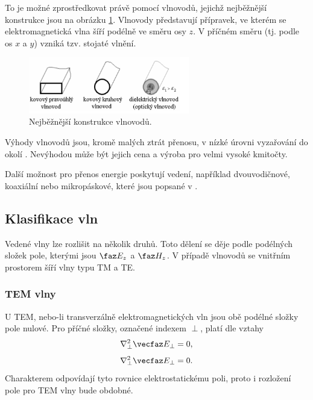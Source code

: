 To je možné zprostředkovat právě pomocí vlnovodů, jejichž nejběžnější konstrukce jsou na obrázku \ref{obr:evlny_vlnovody_konstrukce}. Vlnovody představují přípravek, ve kterém se elektromagnetická vlna šíří podélně ve směru osy $z$. V příčném směru (tj. podle os $x$ a $y$) vzniká tzv. stojaté vlnění.
\begin{figure}[!h]
	\centering
	\includegraphics[width=7cm]{evlny_vlnovody_konstrukce.png}
	\caption{Nejběžnější konstrukce vlnovodů.}
	\label{obr:evlny_vlnovody_konstrukce}
\end{figure}
Výhody vlnovodů jsou, kromě malých ztrát přenosu, v nízké úrovni vyzařování do okolí  . Nevýhodou může být jejich cena a výroba pro velmi vysoké kmitočty. 

Další možnost pro přenos energie poskytují vedení, například dvouvodičnové, koaxiální nebo mikropáskové, které jsou popsané v \cite{emp}.

\subsection{Klasifikace vln}
Vedené vlny lze rozlišit na několik druhů. Toto dělení se děje podle podélných složek pole, kterými jsou $\faz E_{z}$ a $\faz H_{z}$. V případě vlnovodů se vnitřním prostorem šíří vlny typu TM a TE.

\subsubsection*{TEM vlny}
U TEM, nebo-li transverzálně elektromagnetických vln jsou obě podélné složky pole nulové. Pro příčné složky, označené indexem $\perp$, platí dle \cite{emp} vztahy
\begin{displaymath}
	\nabla^{2}_{\perp} \vecfaz E_{\perp} = 0,
\end{displaymath}
\begin{displaymath}
	\nabla^{2}_{\perp} \vecfaz E_{\perp} = 0.
\end{displaymath}
Charakterem odpovídají tyto rovnice elektrostatickému poli, proto i rozložení pole pro TEM vlny bude obdobné.

